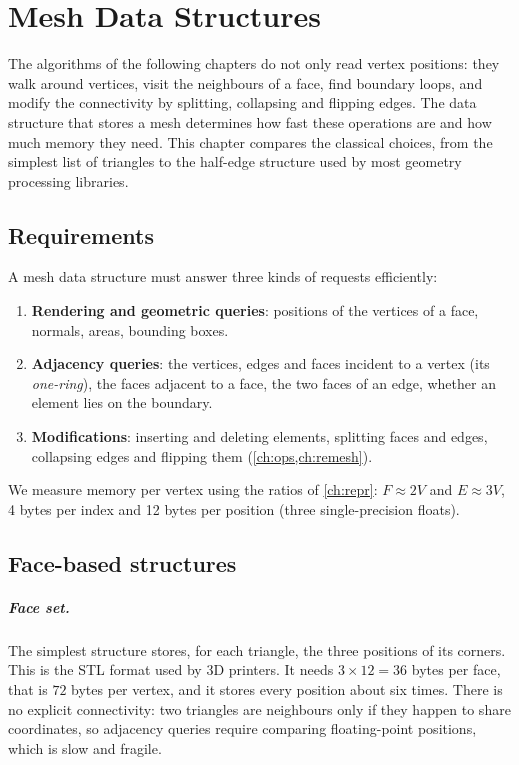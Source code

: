 \chapter{Mesh Data Structures}\label{ch:ds}

The algorithms of the following chapters do not only read vertex positions: they walk around
vertices, visit the neighbours of a face, find boundary loops, and modify the connectivity by
splitting, collapsing and flipping edges. The data structure that stores a mesh determines how
fast these operations are and how much memory they need. This chapter compares the classical
choices, from the simplest list of triangles to the half-edge structure used by most geometry
processing libraries.

\section{Requirements}

A mesh data structure must answer three kinds of requests efficiently:
\begin{enumerate}
  \item \textbf{Rendering and geometric queries}: positions of the vertices of a face, normals,
  areas, bounding boxes.
  \item \textbf{Adjacency queries}: the vertices, edges and faces incident to a vertex (its
  \emph{one-ring}), the faces adjacent to a face, the two faces of an edge, whether an element lies
  on the boundary.
  \item \textbf{Modifications}: inserting and deleting elements, splitting faces and edges,
  collapsing edges and flipping them (\cref{ch:ops,ch:remesh}).
\end{enumerate}
We measure memory per vertex using the ratios of \cref{ch:repr}: $F\approx 2V$ and $E\approx 3V$,
4 bytes per index and 12 bytes per position (three single-precision floats).

\section{Face-based structures}

\paragraph{Face set.} The simplest structure stores, for each triangle, the three positions of its
corners. This is the STL format used by 3D printers. It needs $3\times12=36$ bytes per face, that
is $72$ bytes per vertex, and it stores every position about six times. There is no explicit
connectivity: two triangles are neighbours only if they happen to share coordinates, so
adjacency queries require comparing floating-point positions, which is slow and fragile.

